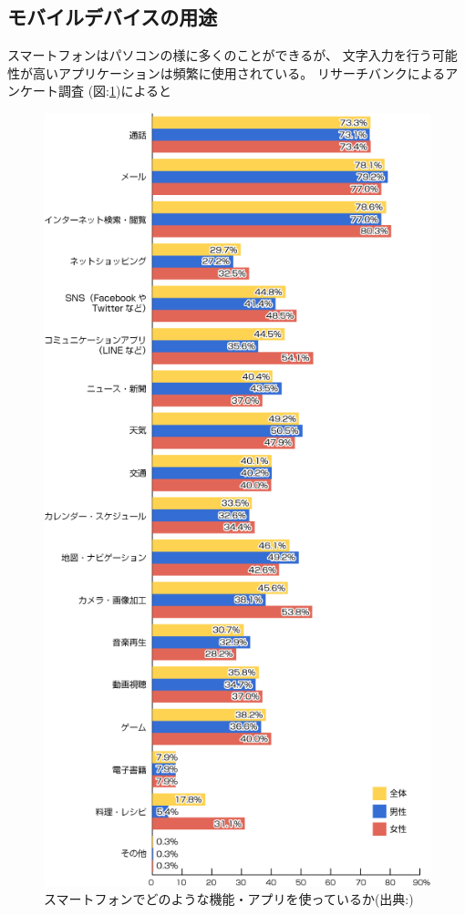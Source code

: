 \subsection{モバイルデバイスの用途}
スマートフォンはパソコンの様に多くのことができるが、
文字入力を行う可能性が高いアプリケーションは頻繁に使用されている。
リサーチバンクによるアンケート調査\cite{researchbanksmartphone}
(図:\ref{fig:purpose})によると
\begin{figure}[htbp]
  \begin{center}
    \includegraphics[width=115mm,bb=0 0 500 1001]{images/purpose.png}
    \caption{スマートフォンでどのような機能・アプリを使っているか(出典:\cite{researchbanksmartphone})}
    \label{fig:purpose}
  \end{center}
\end{figure}
